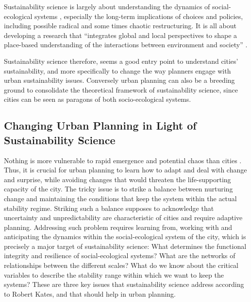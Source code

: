 \documentclass[10pt,a4paper]{article}
\begin{document}
\begin{multicols}{2}

Sustainability science is largely about understanding the dynamics of social-ecological systems \citep{r100}, especially the long-term implications of choices and policies, including possible radical and some times chaotic restructuring. It is all about developing a research that ``integrates global and local perspectives to shape a place-based understanding of the interactions between environment and society'' \citep{r101}.

 Sustainability science therefore, seems a good entry point to understand cities' sustainability, and more specifically to change the way planners engage with urban sustainability issues. Conversely urban planning can also be a breeding ground to consolidate the theoretical framework of sustainability science, since cities can be seen as paragons of both socio-ecological systems.
 
\subsection{Changing Urban Planning in Light of Sustainability Science}
\noindent Nothing is more vulnerable to rapid emergence and potential chaos than cities \citep{r102}. Thus, it is crucial for urban planning to learn how to adapt and deal with change and surprise, while avoiding changes that would threaten the life-supporting capacity of the city. The tricky issue is to strike a balance between nurturing change and maintaining the conditions that keep the system within the actual stability regime. Striking such a balance supposes to acknowledge that uncertainty and unpredictability are characteristic of cities and require adaptive planning. Addressing such problem requires learning from, working with and anticipating the dynamics within the social-ecological system of the city, which is precisely a major target of sustainability science: What determines the functional integrity and resilience of social-ecological systems? What are the networks of relationships between the different scales? What do we know about the critical variables to describe the stability range within which we want to keep the systems? These are three key issues that sustainability science address according to Robert Kates, \citep{r103} and that should help in urban planning.


\end{multicols}
\end{document}
